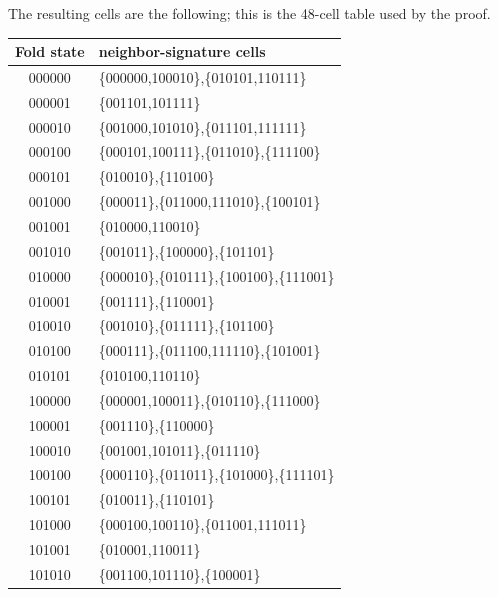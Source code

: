 \documentclass[12pt,a4paper]{article}
\theoremstyle{plain}
\theoremstyle{definition}
\numberwithin{equation}{section}
\begin{document}
The resulting cells are the following; this is the 48-cell table used by the proof.
\begin{center}
\scriptsize
\setlength{\tabcolsep}{3pt}
\renewcommand{\arraystretch}{1.08}
\begin{tabular}{c|l}
Fold state&neighbor-signature cells\\ \hline
000000&\{000000,100010\},\{010101,110111\}\\
000001&\{001101,101111\}\\
000010&\{001000,101010\},\{011101,111111\}\\
000100&\{000101,100111\},\{011010\},\{111100\}\\
000101&\{010010\},\{110100\}\\
001000&\{000011\},\{011000,111010\},\{100101\}\\
001001&\{010000,110010\}\\
001010&\{001011\},\{100000\},\{101101\}\\
010000&\{000010\},\{010111\},\{100100\},\{111001\}\\
010001&\{001111\},\{110001\}\\
010010&\{001010\},\{011111\},\{101100\}\\
010100&\{000111\},\{011100,111110\},\{101001\}\\
010101&\{010100,110110\}\\
100000&\{000001,100011\},\{010110\},\{111000\}\\
100001&\{001110\},\{110000\}\\
100010&\{001001,101011\},\{011110\}\\
100100&\{000110\},\{011011\},\{101000\},\{111101\}\\
100101&\{010011\},\{110101\}\\
101000&\{000100,100110\},\{011001,111011\}\\
101001&\{010001,110011\}\\
101010&\{001100,101110\},\{100001\}
\end{tabular}
\end{center}
\end{document}
